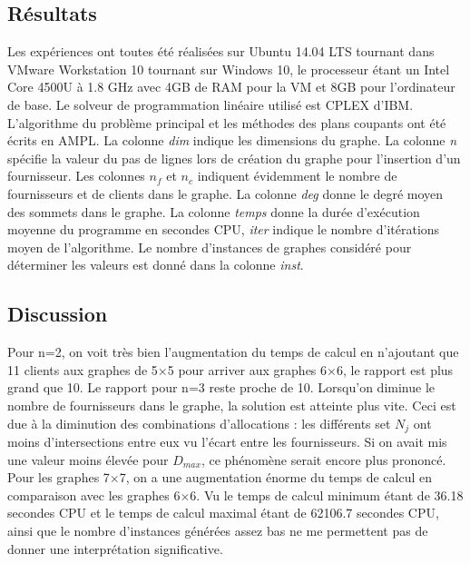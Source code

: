 \documentclass[letterpaper]{article}
\begin{document}
\subsection{Résultats}
Les expériences ont toutes été réalisées sur Ubuntu 14.04 LTS tournant dans VMware Workstation 10 tournant sur Windows 10, le processeur étant un Intel Core 4500U à 1.8 GHz avec 4GB de RAM pour la VM et 8GB pour l'ordinateur de base. Le solveur de programmation linéaire utilisé est CPLEX d'IBM. L'algorithme du problème principal et les méthodes des plans coupants ont été écrits en AMPL.
La colonne \textit{dim} indique les dimensions du graphe. La colonne \textit{n} spécifie la valeur du pas de lignes lors de création du graphe pour l'insertion d'un fournisseur. Les colonnes $n_{f}$ et $n_{c}$ indiquent évidemment le nombre de fournisseurs et de clients dans le graphe. La colonne \textit{deg} donne le degré moyen des sommets dans le graphe. La colonne \textit{temps} donne la durée d'exécution moyenne du programme en secondes CPU, \textit{iter} indique le nombre d'itérations moyen de l'algorithme. Le nombre d'instances de graphes considéré pour déterminer les valeurs est donné dans la colonne \textit{inst}.
\subsection{Discussion}
Pour n=2, on voit très bien l'augmentation du temps de calcul en n'ajoutant que 11 clients aux graphes de 5$\times$5 pour arriver aux graphes 6$\times$6, le rapport est plus grand que 10. Le rapport pour n=3 reste proche de 10. Lorsqu'on diminue le nombre de fournisseurs dans le graphe, la solution est atteinte plus vite. Ceci est due à la diminution des combinations d'allocations : les différents set $N_{j}$ ont moins d'intersections entre eux vu l'écart entre les fournisseurs. Si on avait mis une valeur moins élevée pour $D_{max}$, ce phénomène serait encore plus prononcé.\newline \indent
Pour les graphes 7$\times$7, on a une augmentation énorme du temps de calcul en comparaison avec les graphes 6$\times$6. Vu le temps de calcul minimum étant de 36.18 secondes CPU et le temps de calcul maximal étant de 62106.7 secondes CPU, ainsi que le nombre  d'instances générées assez bas ne me permettent pas de donner une interprétation significative.
\end{document}
